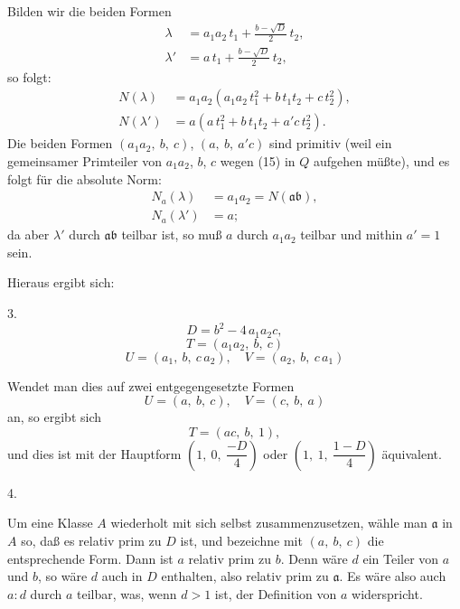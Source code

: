 Bilden wir die beiden Formen
\[
\begin{aligned}
\lambda &= a_1 a_2\,t_1 + \frac{b-\sqrt D}{2}\,t_2, \\
\lambda' &= a\,t_1 + \frac{b-\sqrt D}{2}\,t_2,
\end{aligned}
\]
so folgt:
\[
\begin{aligned}
N(\lambda) &= a_1 a_2 (a_1 a_2\,t_1^2 + b\,t_1 t_2 + c\,t_2^2), \\
N(\lambda') &= a (a\,t_1^2 + b\,t_1 t_2 + a'c\,t_2^2).
\end{aligned}
\]
Die beiden Formen $(a_1 a_2,\ b,\ c)$, $(a,\ b,\ a'c)$ sind primitiv (weil ein gemeinsamer Primteiler von $a_1 a_2$, $b$, $c$ wegen (15) in $Q$ aufgehen müßte), und es folgt für die absolute Norm:
\[
\begin{aligned}
N_a(\lambda) &= a_1 a_2 = N(\mathfrak{a}\mathfrak{b}), \\
N_a(\lambda') &= a;
\end{aligned}
\]
da aber $\lambda'$ durch $\mathfrak{a}\mathfrak{b}$ teilbar ist, so muß $a$ durch $a_1 a_2$ teilbar und mithin $a'=1$ sein.

Hieraus ergibt sich:

3. 
\[
D = b^2 - 4\,a_1 a_2 c,
\]
\[
T = (a_1 a_2,\ b,\ c)
\]
\[
U = (a_1,\ b,\ c\,a_2), \quad V = (a_2,\ b,\ c\,a_1)
\]

Wendet man dies auf zwei entgegengesetzte Formen
\[
U = (a,\ b,\ c), \quad V = (c,\ b,\ a)
\]
an, so ergibt sich
\[
T = (ac,\ b,\ 1),
\]
und dies ist mit der Hauptform $\left(1,\ 0,\ \dfrac{-D}{4}\right)$ oder $\left(1,\ 1,\ \dfrac{1-D}{4}\right)$ äquivalent.

4. 

Um eine Klasse $A$ wiederholt mit sich selbst zusammenzusetzen, wähle man $\mathfrak{a}$ in $A$ so, daß es relativ prim zu $D$ ist, und bezeichne mit $(a,\ b,\ c)$ die entsprechende Form. Dann ist $a$ relativ prim zu $b$. Denn wäre $d$ ein Teiler von $a$ und $b$, so wäre $d$ auch in $D$ enthalten, also relativ prim zu $\mathfrak{a}$. Es wäre also auch $a:d$ durch $a$ teilbar, was, wenn $d>1$ ist, der Definition von $a$ widerspricht.
